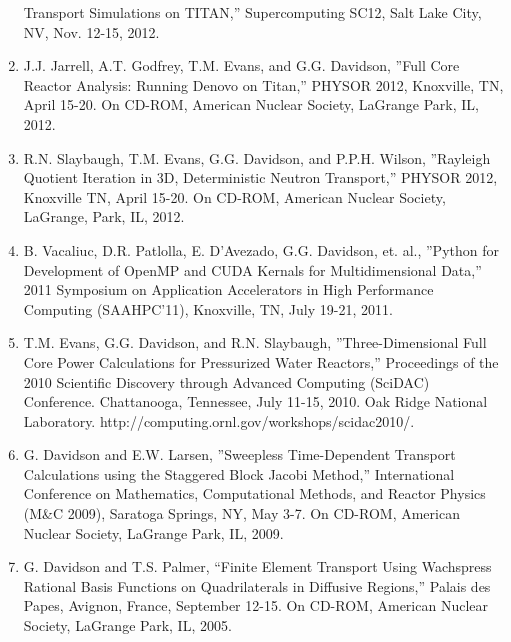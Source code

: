 \documentclass[letterpaper,11pt]{article}
\begin{document}
\begin{enumerate}
    Transport Simulations on TITAN,'' Supercomputing SC12, Salt Lake
    City, NV, Nov. 12-15, 2012.
  \item J.J. Jarrell, A.T. Godfrey, T.M. Evans, and G.G. Davidson,
    ''Full Core Reactor Analysis: Running Denovo on Titan,'' PHYSOR
    2012, Knoxville, TN, April 15-20. On CD-ROM, American Nuclear
    Society, LaGrange Park, IL, 2012.
  \item R.N. Slaybaugh, T.M. Evans, G.G. Davidson, and P.P.H. Wilson,
    ''Rayleigh Quotient Iteration in 3D, Deterministic Neutron
    Transport,'' PHYSOR 2012, Knoxville TN, April 15-20.  On CD-ROM,
    American Nuclear Society, LaGrange, Park, IL, 2012.
  \item B. Vacaliuc, D.R. Patlolla, E. D'Avezado, G.G. Davidson,
    et. al., ''Python for Development of OpenMP and CUDA Kernals for
    Multidimensional Data,'' 2011 Symposium on Application Accelerators
    in High Performance Computing (SAAHPC'11), Knoxville, TN, July
    19-21, 2011.
  \item T.M. Evans, G.G. Davidson, and R.N. Slaybaugh,
    ''Three-Dimensional Full Core Power Calculations for Pressurized
    Water Reactors,'' Proceedings of the 2010 Scientific Discovery
    through Advanced Computing (SciDAC) Conference. Chattanooga,
    Tennessee, July 11-15, 2010. Oak Ridge National
    Laboratory. http://computing.ornl.gov/workshops/scidac2010/.
  \item G. Davidson and E.W. Larsen, ''Sweepless Time-Dependent
    Transport Calculations using the Staggered Block Jacobi Method,''
    International Conference on Mathematics, Computational Methods,
    and Reactor Physics (M\&C 2009), Saratoga Springs, NY, May 3-7.  On
    CD-ROM, American Nuclear Society, LaGrange Park, IL, 2009.
  \item G. Davidson and T.S. Palmer, ``Finite Element Transport Using
    Wachspress Rational Basis Functions on Quadrilaterals in Diffusive
    Regions,'' Palais des Papes, Avignon, France, September 12-15.  On
    CD-ROM, American Nuclear Society, LaGrange Park, IL, 2005.
\end{enumerate}
\end{document}
